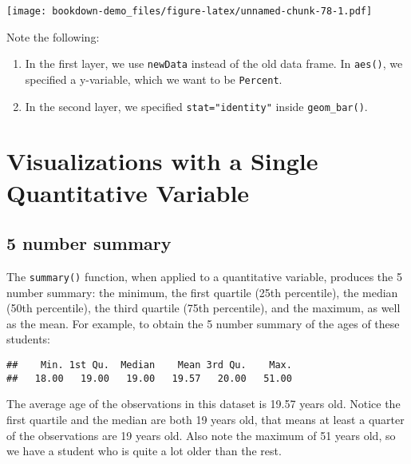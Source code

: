 \documentclass[
]{book}
\newenvironment{Shaded}{\begin{snugshade}}{\end{snugshade}}
\newcommand{\FunctionTok}[1]{\textcolor[rgb]{0.13,0.29,0.53}{\textbf{#1}}}
\newcommand{\NormalTok}[1]{#1}
\newcommand{\SpecialCharTok}[1]{\textcolor[rgb]{0.81,0.36,0.00}{\textbf{#1}}}
\providecommand{\tightlist}{%
  \setlength{\itemsep}{0pt}\setlength{\parskip}{0pt}}
\begin{document}
\texttt{[image: bookdown-demo\_files/figure-latex/unnamed-chunk-78-1.pdf]}

Note the following:

\begin{enumerate}
\def\labelenumi{\arabic{enumi}.}
\tightlist
\item
  In the first layer, we use \texttt{newData} instead of the old data frame. In \texttt{aes()}, we specified a y-variable, which we want to be \texttt{Percent}.
\item
  In the second layer, we specified \texttt{stat="identity"} inside \texttt{geom\_bar()}.
\end{enumerate}

\hypertarget{visualizations-with-a-single-quantitative-variable}{%
\section{Visualizations with a Single Quantitative Variable}\label{visualizations-with-a-single-quantitative-variable}}

\hypertarget{number-summary}{%
\subsection{5 number summary}\label{number-summary}}

The \texttt{summary()} function, when applied to a quantitative variable, produces the 5 number summary: the minimum, the first quartile (25th percentile), the median (50th percentile), the third quartile (75th percentile), and the maximum, as well as the mean. For example, to obtain the 5 number summary of the ages of these students:

\begin{Shaded}
\end{Shaded}

\begin{verbatim}
##    Min. 1st Qu.  Median    Mean 3rd Qu.    Max. 
##   18.00   19.00   19.00   19.57   20.00   51.00
\end{verbatim}

The average age of the observations in this dataset is 19.57 years old. Notice the first quartile and the median are both 19 years old, that means at least a quarter of the observations are 19 years old. Also note the maximum of 51 years old, so we have a student who is quite a lot older than the rest.
\end{document}

